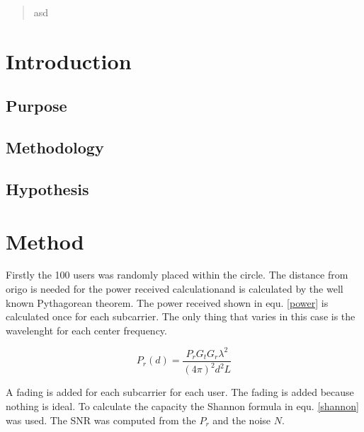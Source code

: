 \documentclass[twocolumn]{article}
\begin{document}
\pagestyle{fancy}
\fancyfoot[c]{}

\onecolumn
\begin{abstract}
asd
\end{abstract}
\clearpage

\tableofcontents
\clearpage
\setcounter{page}{1}
\fancyfoot[c]{\thepage}
\twocolumn


\section{Introduction}

\subsection{Purpose}
\subsection{Methodology}
\subsection{Hypothesis}

\section{Method}
Firstly the 100 users was randomly placed within the circle. The distance from origo is needed for the power received calculationand is calculated by the well known Pythagorean theorem. The power received shown in equ. \eqref{power}  is calculated once for each subcarrier. The only thing that varies in this case is the wavelenght for each center frequency.

\begin{equation}
\label{power}
P_r(d)=\frac{P_rG_tG_r\lambda^2}{(4\pi)^2d^2L}
\end{equation}

A fading is added for each subcarrier for each user. The fading is added because nothing is ideal.%
To calculate the capacity the Shannon formula in equ. \eqref{shannon} was used. The SNR was computed from the $P_r$ and the noise $N$.
\end{document}
